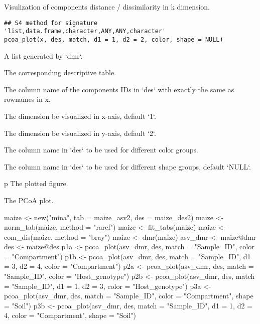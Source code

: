 \documentclass[a4paper]{book}
\begin{document}
%
\begin{Description}\relax
Visulization of components distance / dissimilarity in k dimension.
\end{Description}
%
\begin{Usage}
\begin{verbatim}
## S4 method for signature 'list,data.frame,character,ANY,ANY,character'
pcoa_plot(x, des, match, d1 = 1, d2 = 2, color, shape = NULL)
\end{verbatim}
\end{Usage}
%
\begin{Arguments}
\begin{ldescription}
\item[\code{x}] A list generated by `dmr`.

\item[\code{des}] The corresponding descriptive table.

\item[\code{match}] The column name of the components IDs in `des` with exactly the
same as rownames in x.

\item[\code{d1}] The dimension be visualized in x-axis, default `1`.

\item[\code{d2}] The dimension be visualized in y-axis, default `2`.

\item[\code{color}] The column name in `des` to be used for different color groups.

\item[\code{shape}] The column name in `des` to be used for different shape groups,
default `NULL`.
\end{ldescription}
\end{Arguments}
%
\begin{Value}
p The plotted figure.

The PCoA plot.
\end{Value}
%
\begin{Examples}
\begin{ExampleCode}
maize <- new("mina", tab = maize_asv2, des = maize_des2)
maize <- norm_tab(maize, method = "raref")
maize <- fit_tabs(maize)
maize <- com_dis(maize, method = "bray")
maize <- dmr(maize)
asv_dmr <- maize@dmr
des <- maize@des
p1a <- pcoa_plot(asv_dmr, des, match = "Sample_ID", color = "Compartment")
p1b <- pcoa_plot(asv_dmr, des, match = "Sample_ID", d1 = 3, d2 = 4, color =
"Compartment")
p2a <- pcoa_plot(asv_dmr, des, match = "Sample_ID", color = "Host_genotype")
p2b <- pcoa_plot(asv_dmr, des, match = "Sample_ID", d1 = 1, d2 = 3, color =
"Host_genotype")
p3a <- pcoa_plot(asv_dmr, des, match = "Sample_ID", color = "Compartment",
shape = "Soil")
p3b <- pcoa_plot(asv_dmr, des, match = "Sample_ID", d1 = 1, d2 = 4, color =
"Compartment", shape = "Soil")
\end{ExampleCode}
\end{Examples}
\end{document}
